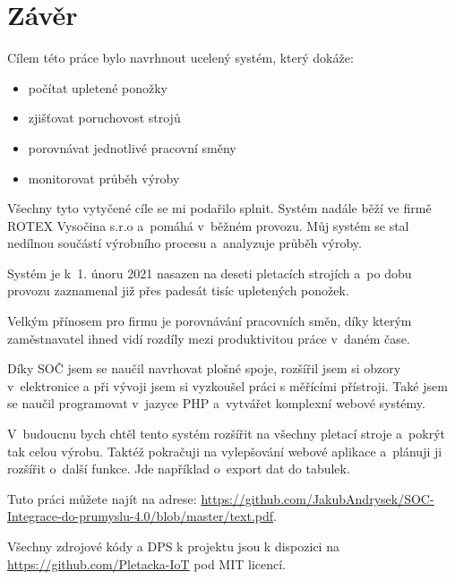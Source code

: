 \chapter*{Závěr}

Cílem této práce bylo navrhnout ucelený systém, který dokáže:

\begin{itemize}
    \item počítat upletené ponožky
    \item zjišťovat poruchovost strojů
    \item porovnávat jednotlivé pracovní směny
    \item monitorovat průběh výroby
\end{itemize}

Všechny tyto vytyčené cíle se mi podařilo splnit. Systém nadále běží ve firmě ROTEX Vysočina s.r.o \cite{ROTEX} a~pomáhá v~běžném provozu.
Můj systém se stal nedílnou součástí výrobního procesu a~analyzuje průběh výroby.

Systém je k~1. únoru 2021 nasazen na deseti pletacích strojích a~po dobu provozu zaznamenal již přes padesát tisíc upletených ponožek.

Velkým přínosem pro firmu je porovnávání pracovních směn, díky kterým zaměstnavatel ihned vidí rozdíly mezi produktivitou práce v~daném čase.

Díky SOČ jsem se naučil navrhovat plošné spoje, rozšířil jsem si obzory v~elektronice a při vývoji jsem si vyzkoušel práci s měřícími přístroji. 
Také jsem se naučil programovat v~jazyce PHP a~vytvářet komplexní webové systémy.

V~budoucnu bych chtěl tento systém rozšířit na všechny pletací stroje a~pokrýt tak celou výrobu.
Taktéž pokračuji na vylepšování webové aplikace a~plánuji ji rozšířit o~další funkce.
Jde například o~export dat do tabulek.

Tuto práci můžete najít na adrese: \url{https://github.com/JakubAndrysek/SOC-Integrace-do-prumyslu-4.0/blob/master/text.pdf}.

Všechny zdrojové kódy a DPS k projektu jsou k dispozici na \url{https://github.com/Pletacka-IoT} pod MIT licencí.


\newpage